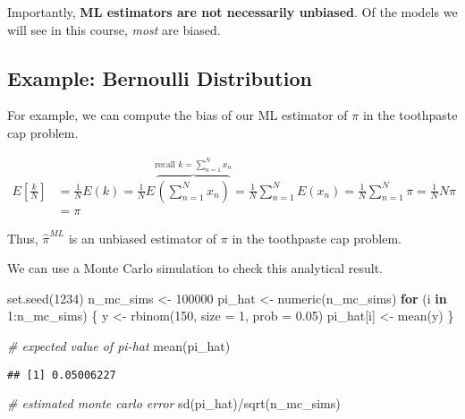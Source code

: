 \documentclass[
]{book}
\newenvironment{Shaded}{\begin{snugshade}}{\end{snugshade}}
\newcommand{\AttributeTok}[1]{\textcolor[rgb]{0.77,0.63,0.00}{#1}}
\newcommand{\CommentTok}[1]{\textcolor[rgb]{0.56,0.35,0.01}{\textit{#1}}}
\newcommand{\ControlFlowTok}[1]{\textcolor[rgb]{0.13,0.29,0.53}{\textbf{#1}}}
\newcommand{\DecValTok}[1]{\textcolor[rgb]{0.00,0.00,0.81}{#1}}
\newcommand{\FloatTok}[1]{\textcolor[rgb]{0.00,0.00,0.81}{#1}}
\newcommand{\FunctionTok}[1]{\textcolor[rgb]{0.00,0.00,0.00}{#1}}
\newcommand{\NormalTok}[1]{#1}
\newcommand{\OtherTok}[1]{\textcolor[rgb]{0.56,0.35,0.01}{#1}}
\newcommand{\SpecialCharTok}[1]{\textcolor[rgb]{0.00,0.00,0.00}{#1}}
\begin{document}
Importantly, \textbf{ML estimators are not necessarily unbiased}. Of the
models we will see in this course, \emph{most} are biased.

\hypertarget{example-bernoulli-distribution-1}{%
\subsection{Example: Bernoulli
Distribution}\label{example-bernoulli-distribution-1}}

For example, we can compute the bias of our ML estimator of \(\pi\) in
the toothpaste cap problem.

\[
\begin{aligned}
E\left[ \frac{k}{N}\right] &= \frac{1}{N} E(k) = \frac{1}{N} E  \overbrace{ \left( \sum_{n = 1}^N x_n \right) }^{\text{recall } k = \sum_{n = 1}^N x_n } = \frac{1}{N} \sum_{n = 1}^N E(x_n) = \frac{1}{N} \sum_{n = 1}^N \pi = \frac{1}{N}N\pi \\
&= \pi
\end{aligned}
\]

Thus, \(\hat{\pi}^{ML}\) is an unbiased estimator of \(\pi\) in the
toothpaste cap problem.

We can use a Monte Carlo simulation to check this analytical result.

\begin{Shaded}
\begin{Highlighting}[]
\FunctionTok{set.seed}\NormalTok{(}\DecValTok{1234}\NormalTok{)}
\NormalTok{n\_mc\_sims }\OtherTok{\textless{}{-}} \DecValTok{100000}
\NormalTok{pi\_hat }\OtherTok{\textless{}{-}} \FunctionTok{numeric}\NormalTok{(n\_mc\_sims)}
\ControlFlowTok{for}\NormalTok{ (i }\ControlFlowTok{in} \DecValTok{1}\SpecialCharTok{:}\NormalTok{n\_mc\_sims) \{}
\NormalTok{  y }\OtherTok{\textless{}{-}} \FunctionTok{rbinom}\NormalTok{(}\DecValTok{150}\NormalTok{, }\AttributeTok{size =} \DecValTok{1}\NormalTok{, }\AttributeTok{prob =} \FloatTok{0.05}\NormalTok{)}
\NormalTok{  pi\_hat[i] }\OtherTok{\textless{}{-}} \FunctionTok{mean}\NormalTok{(y)}
\NormalTok{\}}

\CommentTok{\# expected value of pi{-}hat}
\FunctionTok{mean}\NormalTok{(pi\_hat)}
\end{Highlighting}
\end{Shaded}

\begin{verbatim}
## [1] 0.05006227
\end{verbatim}

\begin{Shaded}
\begin{Highlighting}[]
\CommentTok{\# estimated monte carlo error}
\FunctionTok{sd}\NormalTok{(pi\_hat)}\SpecialCharTok{/}\FunctionTok{sqrt}\NormalTok{(n\_mc\_sims)}
\end{Highlighting}
\end{Shaded}
\end{document}
